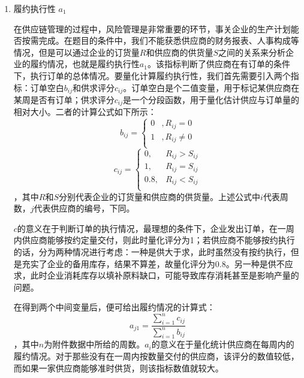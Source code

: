 \documentclass{my_paper}
\begin{document}
\begin{enumerate}
    \item 履约执行性 $a_1$
    
    在供应链管理的过程中，风险管理\cite{1}是非常重要的环节，事关企业的生产计划能否按需完成。在题目的条件中，我们不能获悉供应商的财务报表、人事构成等情况，但是可以通过企业的订货量$R$和供应商的供货量$S$之间的关系来分析企业的履约情况，也就是履约执行性$a_1$。该指标判断了供应商在有订单的条件下，执行订单的总体情况。要量化计算履约执行性，我们首先需要引入两个指标：订单空白$b_{ij}$和供求评分$c_{ij}$。订单空白是个二值变量，用于标记某供应商在某周是否有订单；供求评分$c_{ij}$是一个分段函数，用于量化估计供应与订单量的相对大小。二者的计算公式如下所示：
    \begin{equation}
    b_{ij} = \begin{cases}
        0&,R_{ij}=0\\
        1&,R_{ij}\neq 0\\
    \end{cases}
    \label{bij}
    \end{equation}
    \begin{equation}
    c_{ij}=\begin{cases}
        0,&R_{ij}>S_{ij}\\
        1,&R_{ij}=S_{ij}\\
        0.8,&R_{ij}<S_{ij}\\
    \end{cases}
    \label{cij}
    \end{equation}
    ，其中$R$和$S$分别代表企业的订货量和供应商的供货量。上述公式中$i$代表周数，$j$代表供应商的编号，下同。
    
    $c$的意义在于判断订单的执行情况，最理想的条件下，企业发出订单，在一周内供应商能够按约定量交付，则此时量化评分为1；若供应商不能够按约执行的话，分为两种情况进行考虑：一种是供大于求，此时虽然没有按约执行，但是充实了企业的备用库存，结果不算差，故量化评分为$0.8$。另一种是供不应求，此时企业消耗库存以填补原料缺口，可能导致库存消耗甚至是影响产量的问题。
    
    在得到两个中间变量后，便可给出履约情况的计算式：
    \begin{equation}
    a_{j1}=\frac{\sum\limits^n_{i=1}c_{ij}}{\sum\limits^n_{i=1}b_{ij}}
    \label{aj1}
    \end{equation}
    ，其中$n$为附件数据中所给的周数。$a_i$的意义在于量化统计供应商在每周内的履约情况。对于那些没有在一周内按数量交付的供应商，该评分的数值较低，而如果一家供应商能够准时供货，则该指标数值就较大。


\end{enumerate}
\end{document}
